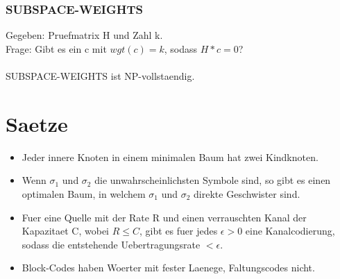 \documentclass[a4paper]{scrreprt}
\begin{document}
\subsubsection{SUBSPACE-WEIGHTS}
Gegeben: Pruefmatrix H und Zahl k.\\
Frage: Gibt es ein c mit $wgt(c) = k$, sodass $H*c = 0$?\\\\
SUBSPACE-WEIGHTS ist NP-vollstaendig.


\section{Saetze}
\begin{itemize}
	\item Jeder innere Knoten in einem minimalen Baum hat zwei Kindknoten.
	\item Wenn $\sigma_1$ und $\sigma_2$ die unwahrscheinlichsten Symbole sind, so gibt es einen optimalen Baum, in welchem $\sigma_1$ und $\sigma_2$ direkte Geschwister sind.
	\item Fuer eine Quelle mit der Rate R und einen verrauschten Kanal der Kapazitaet C, wobei $R \le C$, gibt es fuer jedes $\epsilon > 0$ eine Kanalcodierung, sodass die entstehende Uebertragungsrate $< \epsilon$.
	\item Block-Codes haben Woerter mit fester Laenege, Faltungscodes nicht.
\end{itemize}
\end{document}
